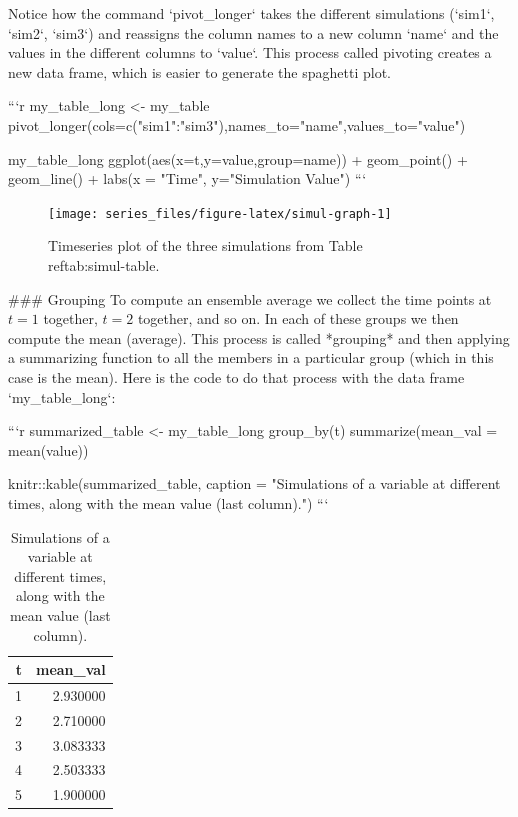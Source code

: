 \documentclass[
]{book}
\theoremstyle{definition}
\theoremstyle{definition}
\theoremstyle{definition}
\theoremstyle{remark}
\begin{document}
Notice how the command `pivot_longer` takes the different simulations (`sim1`, `sim2`, `sim3`) and reassigns the column names to a new column `name` and the values in the different columns to `value`. This process called pivoting creates a new data frame, which is easier to generate the spaghetti plot.



```r
my_table_long <- my_table %
  pivot_longer(cols=c("sim1":"sim3"),names_to="name",values_to="value")

my_table_long %
  ggplot(aes(x=t,y=value,group=name)) +
  geom_point() +
  geom_line() +
  labs(x = "Time", y="Simulation Value")
```

\begin{figure}

{\centering \texttt{[image: series\_files/figure-latex/simul-graph-1]} 

}

\caption{Timeseries plot of the three simulations from Table \\ref{tab:simul-table}.}\label{fig:simul-graph}
\end{figure}

### Grouping
To compute an ensemble average we collect the time points at $t=1$ together, $t=2$ together, and so on. In each of these groups we then compute the mean (average). This process is called *grouping* and then applying a summarizing function to all the members in a particular group (which in this case is the mean). Here is the code to do that process with the data frame `my_table_long`:


```r
summarized_table <- my_table_long %
  group_by(t) %
  summarize(mean_val = mean(value))

knitr::kable(summarized_table, caption = "Simulations of a variable at different times, along with the mean value (last column).")
```

\begin{table}

\caption{\label{tab:table-summary}Simulations of a variable at different times, along with the mean value (last column).}
\centering
\begin{tabular}[t]{r|r}
\hline
t & mean\_val\\
\hline
1 & 2.930000\\
\hline
2 & 2.710000\\
\hline
3 & 3.083333\\
\hline
4 & 2.503333\\
\hline
5 & 1.900000\\
\hline
\end{tabular}
\end{table}
\end{document}
